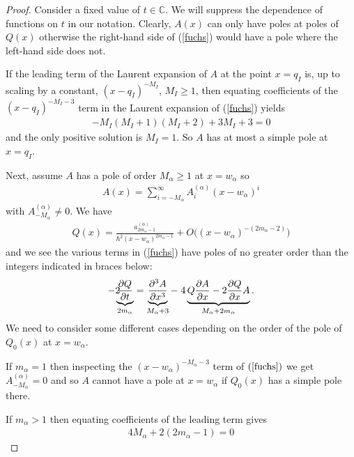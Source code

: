 \documentclass[a4paper,12pt,reqno]{amsart}
\numberwithin{equation}{section}
\numberwithin{counter2}{section}
\begin{document}
\begin{proof} 
Consider a fixed value of $t \in \mathbb{C}$.  We will suppress the dependence of functions on $t$ in our notation.  Clearly,  $A(x)$ can only have poles at poles of $Q(x)$ otherwise the right-hand side of (\ref{fuchs}) would have a pole where the left-hand side does not.  %

If the leading term of the Laurent expansion of $A$ at the point $x = q_I$ is,  up to scaling by a constant,  $(x-q_I)^{-M_I}$,  $M_I \ge 1$,  then equating coefficients of the $(x-q_I)^{-M_I-3}$ term in the Laurent expansion of (\ref{fuchs}) yields
\begin{align}\label{m_relation}
-M_I(M_I+1)(M_I+2) + 3M_I + 3 = 0
\end{align}
and the only positive solution is $M_I = 1$.  So $A$ has at most a simple pole at $x = q_I$.\par 
Next,  assume $A$ has a pole of order $M_\alpha \ge 1$ at $x = w_\alpha$ so 
\begin{align}
A(x) = \sum_{i=-M_\alpha}^{\infty} A_{i}^{(\alpha)}(x-w_\alpha)^{i}
\end{align}
with $A_{-M_\alpha}^{(\alpha)} \ne 0$.  We have
\begin{align}
Q(x) = \frac{a_{2m_\alpha - 1}^{(\alpha)}}{\hbar^2(x-w_\alpha)^{2m_\alpha-1}} + O\Big((x-w_\alpha)^{-(2m_\alpha-2)}\Big)
\end{align} 
and we see the various terms in (\ref{fuchs}) have poles of no greater order than the integers indicated in braces below:
\begin{align}
-2 \hspace{-2mm}\underbrace{\frac{\partial Q}{\partial t}}_{2m_\alpha} = \underbrace{\frac{\partial^3 A}{\partial x^3}}_{M_\alpha + 3} -  \hspace{1mm} 4\underbrace{Q\frac{\partial A}{\partial x} - 2\frac{\partial Q}{\partial x}A}_{M_\alpha+2m_\alpha}.  
\end{align}
We need to consider some different cases depending on the order of the pole of $Q_0(x)$ at $x = w_\alpha$.  \par 
If $m_\alpha = 1$ then inspecting the $(x-w_{\alpha})^{-M_\alpha - 3}$ term of $(\ref{fuchs})$ we get $A_{-M_\alpha}^{(\alpha)}  = 0$ and so $A$ cannot have a pole at $x = w_\alpha$ if $Q_0(x)$ has a simple pole there.  \par If $m_\alpha > 1$ then equating coefficients of the leading term gives 
\begin{align}
4M_\alpha + 2(2m_\alpha-1) = 0
\end{align}

\end{proof}
\end{document}
